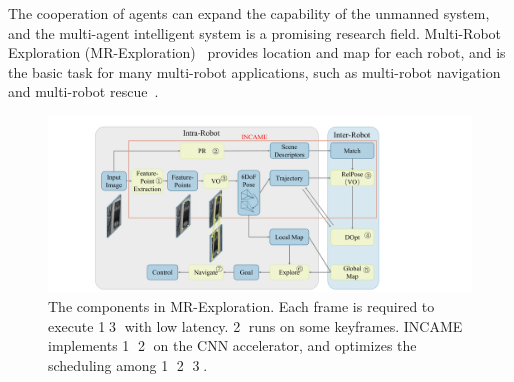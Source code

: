 \label{sec:intro}

The cooperation of agents can expand the capability of the unmanned system, and the multi-agent intelligent system is a promising research field.
Multi-Robot Exploration (MR-Exploration)~\cite{corah2019communication} provides location and map for each robot, and is the basic task for many multi-robot applications, such as multi-robot navigation~\cite{tanner2005towards} and multi-robot rescue~\cite{baxter2007multi}.


\begin{figure}[t]
 \centering
	\includegraphics[width=0.99\linewidth]{fig/maexp.pdf}
 \caption{
 The components in MR-Exploration. Each frame is required to execute \textcircled{1}\textcircled{3} with low latency. \textcircled{2} runs on some keyframes. INCAME implements \textcircled{1} \textcircled{2} on the CNN accelerator, and optimizes the scheduling among \textcircled{1} \textcircled{2} \textcircled{3}.
 }
	\label{fig:maexp}
\end{figure}

